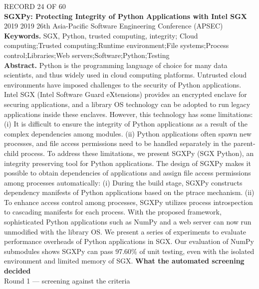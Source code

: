 \documentclass[11pt,a4paper]{article}
\begin{document}
\clearpage
{\color{soft}\footnotesize RECORD 24 OF 60}\\[1mm]
{\large\bfseries SGXPy: Protecting Integrity of Python Applications with Intel SGX}\\[1.5mm]
{\color{soft}\small 2019 \textperiodcentered{} 2019 26th Asia-Pacific Software Engineering Conference (APSEC)}\\[2mm]
{\small\textbf{Keywords.} SGX, Python, trusted computing, integrity; Cloud computing;Trusted computing;Runtime environment;File systems;Process control;Libraries;Web servers;Software;Python;Testing}\\[2mm]
{\small\textbf{Abstract.} Python is the programming language of choice for many data scientists, and thus widely used in cloud computing platforms. Untrusted cloud environments have imposed challenges to the security of Python applications. Intel SGX (Intel Software Guard eXtensions) provides an encrypted enclave for securing applications, and a library OS technology can be adopted to run legacy applications inside these enclaves. However, this technology has some limitations: (i) It is difficult to ensure the integrity of Python applications as a result of the complex dependencies among modules. (ii) Python applications often spawn new processes, and file access permissions need to be handled separately in the parent-child process. To address these limitations, we present SGXPy (SGX Python), an integrity preserving tool for Python applications. The design of SGXPy makes it possible to obtain dependencies of applications and assign file access permissions among processes automatically: (i) During the build stage, SGXPy constructs dependency manifests of Python applications based on the ptrace mechanism. (ii) To enhance access control among processes, SGXPy utilizes process introspection to cascading manifests for each process. With the proposed framework, sophisticated Python applications such as NumPy and a web server can now run unmodified with the library OS. We present a series of experiments to evaluate performance overheads of Python applications in SGX. Our evaluation of NumPy submodules shows SGXPy can pass 97.60\% of unit testing, even with the isolated environment and limited memory of SGX.}
\vspace{3mm}
\vspace{2.5mm}
{\small\textbf{What the automated screening decided}}\\[2mm]
{\footnotesize\color{soft}Round 1 --- screening against the criteria}\\[0.5mm]
\end{document}
